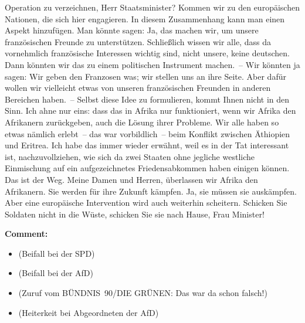 \documentclass{article}
\begin{document}
Operation zu verzeichnen, Herr Staatsminister?  Kommen wir zu den europäischen Nationen, die sich hier engagieren. In diesem Zusammenhang kann man einen Aspekt hinzufügen. Man könnte sagen: Ja, das machen wir, um unsere französischen Freunde zu unterstützen. Schließlich wissen wir alle, dass da vornehmlich französische Interessen wichtig sind, nicht unsere, keine deutschen. Dann könnten wir das zu einem politischen Instrument machen. – Wir könnten ja sagen: Wir geben den Franzosen was; wir stellen uns an ihre Seite. Aber dafür wollen wir vielleicht etwas von unseren französischen Freunden in anderen Bereichen haben. – Selbst diese Idee zu formulieren, kommt Ihnen nicht in den Sinn. Ich ahne nur eins: dass das in Afrika nur funktioniert, wenn wir Afrika den Afrikanern zurückgeben, auch die Lösung ihrer Probleme. Wir alle haben so etwas nämlich erlebt – das war vorbildlich – beim Konflikt zwischen Äthiopien und Eritrea. Ich habe das immer wieder erwähnt, weil es in der Tat interessant ist, nachzuvollziehen, wie sich da zwei Staaten ohne jegliche westliche Einmischung auf ein aufgezeichnetes Friedensabkommen haben einigen können. Das ist der Weg. Meine Damen und Herren, überlassen wir Afrika den Afrikanern. Sie werden für ihre Zukunft kämpfen. Ja, sie müssen sie auskämpfen. Aber eine europäische Intervention wird auch weiterhin scheitern. Schicken Sie Soldaten nicht in die Wüste, schicken Sie sie nach Hause, Frau Minister!  

\noindent\textbf{Comment:}
\begin{itemize}
    \setlength\itemsep{-3pt}
    \item (Beifall bei der SPD)
    \setlength\itemsep{-3pt}
    \item (Beifall bei der AfD)
    \setlength\itemsep{-3pt}
    \item (Zuruf vom BÜNDNIS 90/DIE GRÜNEN: Das war da schon falsch!)
    \setlength\itemsep{-3pt}
    \item (Heiterkeit bei Abgeordneten der AfD)
\end{itemize}
\end{document}
